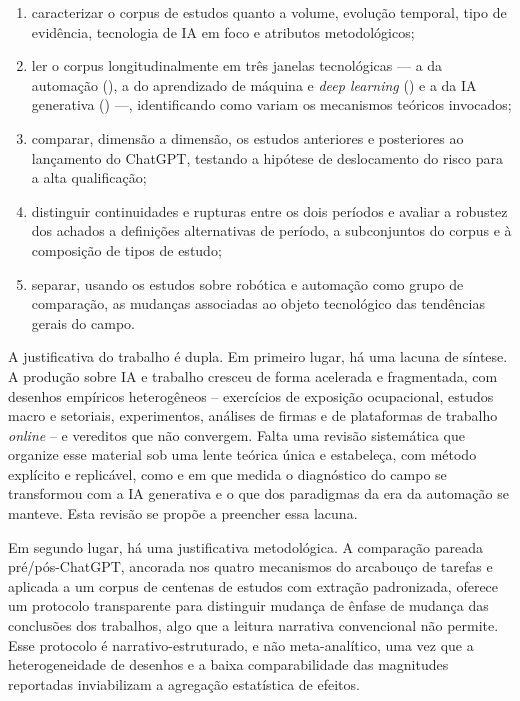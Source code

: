 \begin{enumerate}
  \item caracterizar o corpus de estudos quanto a volume, evolução temporal,
    tipo de evidência, tecnologia de IA em foco e atributos metodológicos;
  \item ler o corpus longitudinalmente em três janelas tecnológicas --- a da
    automação (\janelaUm{}), a do aprendizado de máquina e \textit{deep learning}
    (\janelaDois{}) e a da IA generativa (\janelaTres{}) ---, identificando como
    variam os mecanismos teóricos invocados;
  \item comparar, dimensão a dimensão, os estudos anteriores e posteriores ao
    lançamento do ChatGPT, testando a hipótese de deslocamento do risco para a
    alta qualificação;
  \item distinguir continuidades e rupturas entre os dois períodos e avaliar a
    robustez dos achados a definições alternativas de período, a subconjuntos
    do corpus e à composição de tipos de estudo;
  \item separar, usando os estudos sobre robótica e automação como grupo de
    comparação, as mudanças associadas ao objeto tecnológico das tendências
    gerais do campo.
\end{enumerate}

A justificativa do trabalho é dupla. Em primeiro lugar, há uma lacuna de síntese. A produção sobre IA e trabalho cresceu de forma acelerada e fragmentada, com desenhos empíricos heterogêneos -- exercícios de exposição ocupacional, estudos macro e setoriais, experimentos, análises de firmas e de plataformas de trabalho \textit{online} -- e vereditos que não convergem. Falta uma revisão sistemática que organize esse material sob uma lente teórica única e estabeleça, com método explícito e replicável, como e em que medida o diagnóstico do campo se transformou com a IA generativa e o que dos paradigmas da era da automação se manteve. Esta revisão se propõe a preencher essa lacuna.

Em segundo lugar, há uma justificativa metodológica. A comparação pareada pré/pós-ChatGPT, ancorada nos quatro mecanismos do arcabouço de tarefas e aplicada a um corpus de centenas de estudos com extração padronizada, oferece um protocolo transparente para distinguir mudança de ênfase de mudança das conclusões dos trabalhos, algo que a leitura narrativa convencional não permite. Esse protocolo é narrativo-estruturado, e não meta-analítico, uma vez que a heterogeneidade de desenhos e a baixa comparabilidade das magnitudes reportadas inviabilizam a agregação estatística de efeitos.

